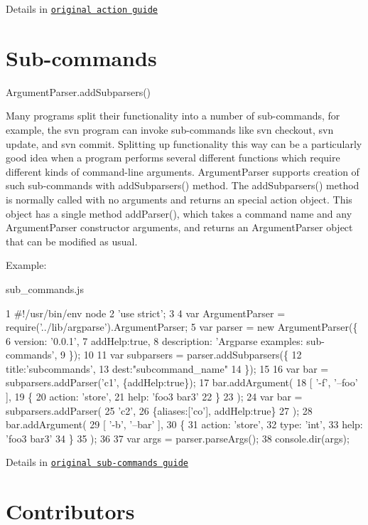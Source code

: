 Details in \href{http://docs.python.org/dev/library/argparse.html#action}{\tt original action guide}

\section*{Sub-\/commands }

Argument\+Parser.\+add\+Subparsers()

Many programs split their functionality into a number of sub-\/commands, for example, the svn program can invoke sub-\/commands like {\ttfamily svn checkout}, {\ttfamily svn update}, and {\ttfamily svn commit}. Splitting up functionality this way can be a particularly good idea when a program performs several different functions which require different kinds of command-\/line arguments. {\ttfamily Argument\+Parser} supports creation of such sub-\/commands with {\ttfamily add\+Subparsers()} method. The {\ttfamily add\+Subparsers()} method is normally called with no arguments and returns an special action object. This object has a single method {\ttfamily add\+Parser()}, which takes a command name and any {\ttfamily Argument\+Parser} constructor arguments, and returns an {\ttfamily Argument\+Parser} object that can be modified as usual.

Example\+:

sub\+\_\+commands.\+js 
\begin{DoxyCode}
1 #!/usr/bin/env node
2 'use strict';
3 
4 var ArgumentParser = require('../lib/argparse').ArgumentParser;
5 var parser = new ArgumentParser(\{
6   version: '0.0.1',
7   addHelp:true,
8   description: 'Argparse examples: sub-commands',
9 \});
10 
11 var subparsers = parser.addSubparsers(\{
12   title:'subcommands',
13   dest:"subcommand\_name"
14 \});
15 
16 var bar = subparsers.addParser('c1', \{addHelp:true\});
17 bar.addArgument(
18   [ '-f', '--foo' ],
19   \{
20     action: 'store',
21     help: 'foo3 bar3'
22   \}
23 );
24 var bar = subparsers.addParser(
25   'c2',
26   \{aliases:['co'], addHelp:true\}
27 );
28 bar.addArgument(
29   [ '-b', '--bar' ],
30   \{
31     action: 'store',
32     type: 'int',
33     help: 'foo3 bar3'
34   \}
35 );
36 
37 var args = parser.parseArgs();
38 console.dir(args);
\end{DoxyCode}


Details in \href{http://docs.python.org/dev/library/argparse.html#sub-commands}{\tt original sub-\/commands guide}

\section*{Contributors }


